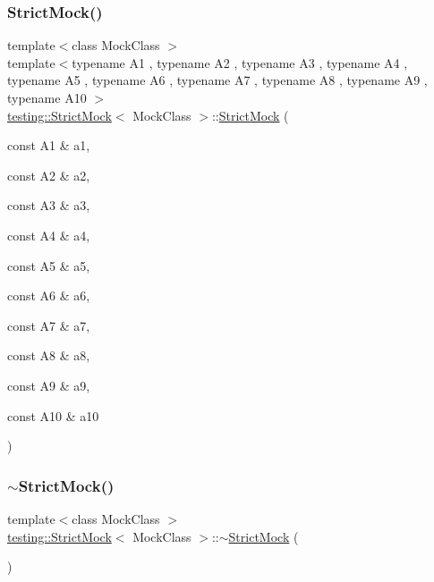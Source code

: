 \subsubsection{\texorpdfstring{StrictMock()}{StrictMock()}\hspace{0.1cm}{\footnotesize\ttfamily [17/17]}}
{\footnotesize\ttfamily template$<$class Mock\+Class $>$ \\
template$<$typename A1 , typename A2 , typename A3 , typename A4 , typename A5 , typename A6 , typename A7 , typename A8 , typename A9 , typename A10 $>$ \\
\mbox{\hyperlink{classtesting_1_1_strict_mock}{testing\+::\+Strict\+Mock}}$<$ Mock\+Class $>$\+::\mbox{\hyperlink{classtesting_1_1_strict_mock}{Strict\+Mock}} (\begin{DoxyParamCaption}\item[{const A1 \&}]{a1,  }\item[{const A2 \&}]{a2,  }\item[{const A3 \&}]{a3,  }\item[{const A4 \&}]{a4,  }\item[{const A5 \&}]{a5,  }\item[{const A6 \&}]{a6,  }\item[{const A7 \&}]{a7,  }\item[{const A8 \&}]{a8,  }\item[{const A9 \&}]{a9,  }\item[{const A10 \&}]{a10 }\end{DoxyParamCaption})\hspace{0.3cm}{\ttfamily [inline]}}

\mbox{\label{classtesting_1_1_strict_mock_a1c7ec10ea86747bb23037380a7353bd1}} 
\subsubsection{\texorpdfstring{$\sim$StrictMock()}{~StrictMock()}\hspace{0.1cm}{\footnotesize\ttfamily [3/3]}}
{\footnotesize\ttfamily template$<$class Mock\+Class $>$ \\
\mbox{\hyperlink{classtesting_1_1_strict_mock}{testing\+::\+Strict\+Mock}}$<$ Mock\+Class $>$\+::$\sim$\mbox{\hyperlink{classtesting_1_1_strict_mock}{Strict\+Mock}} (\begin{DoxyParamCaption}{ }\end{DoxyParamCaption})\hspace{0.3cm}{\ttfamily [inline]}}



